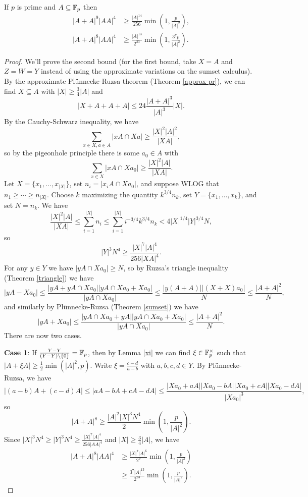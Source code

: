 \begin{thm} If $p$ is prime and $A \subseteq \mathbb{F}_p$ then
\begin{align*}
|A+A|^9|AA|^4 &\ge \frac{|A|^{14}}{256}\min\left(1,\frac{p}{|A|^2}\right),\\
|A+A|^8|AA|^4 &\ge \frac{|A|^{13}}{2^{23}}\min\left(1,\frac{3^7p}{|A|^2}\right).
\end{align*}
\end{thm}
\begin{proof} We'll prove the second bound (for the first bound, take $X=A$ and $Z=W=Y$ instead of using the approximate variations on the sumset calculus). By the approximate Pl\"unnecke-Ruzsa theorem (Theorem \ref{approx-pr}), we can find $X \subseteq A$ with $|X| \ge \frac{3}{4}|A|$ and
\[
|X+A+A+A| \le 24\frac{|A+A|^3}{|A|^3}|X|.
\]
By the Cauchy-Schwarz inequality, we have
\[
\sum_{x\in X,a\in A} |xA\cap Xa| \ge \frac{|X|^2|A|^2}{|XA|},
\]
so by the pigeonhole principle there is some $a_0\in A$ with
\[
\sum_{x\in X} |xA\cap Xa_0| \ge \frac{|X|^2|A|}{|XA|}.
\]
Let $X = \{x_1, ..., x_{|X|}\}$, set $n_i = |x_iA\cap Xa_0|$, and suppose WLOG that $n_1 \ge \cdots \ge n_{|X|}$. Choose $k$ maximizing the quantity $k^{3/4}n_k$, set $Y = \{x_1, ..., x_k\}$, and set $N = n_k$. We have
\[
\frac{|X|^2|A|}{|XA|} \le \sum_{i=1}^{|X|} n_i \le \sum_{i=1}^{|X|} i^{-3/4}k^{3/4}n_k < 4|X|^{1/4}|Y|^{3/4}N,
\]
so
\[
|Y|^3N^4 \ge \frac{|X|^7|A|^4}{256|XA|^4}.
\]
For any $y\in Y$ we have $|yA\cap Xa_0| \ge N$, so by Ruzsa's triangle inequality (Theorem \ref{triangle}) we have
\[
|yA-Xa_0| \le \frac{|yA+yA\cap Xa_0||yA\cap Xa_0+Xa_0|}{|yA\cap Xa_0|} \le \frac{|y(A+A)||(X+X)a_0|}{N} \le \frac{|A+A|^2}{N},
\]
and similarly by Pl\"unnecke-Ruzsa (Theorem \ref{sumset}) we have
\[
|yA+Xa_0| \le \frac{|yA\cap Xa_0+yA||yA\cap Xa_0+Xa_0|}{|yA\cap Xa_0|} \le \frac{|A+A|^2}{N}.
\]
There are now two cases.

\textbf{Case 1}: If $\frac{Y-Y}{(Y-Y)\setminus\{0\}} = \mathbb{F}_p$, then by Lemma \ref{xi} we can find $\xi \in \mathbb{F}_p^\times$ such that $|A+\xi A| \ge \frac{1}{2}\min(|A|^2,p)$. Write $\xi = \frac{c-d}{a-b}$ with $a,b,c,d \in Y$. By Pl\"unnecke-Ruzsa, we have
\[
|(a-b)A+(c-d)A| \le |aA-bA+cA-dA| \le \frac{|Xa_0+aA||Xa_0-bA||Xa_0+cA||Xa_0-dA|}{|Xa_0|^3},
\]
so
\[
|A+A|^8 \ge \frac{|A|^2|X|^3N^4}{2}\min\left(1,\frac{p}{|A|^2}\right).
\]
Since $|X|^3N^4 \ge |Y|^3N^4 \ge \frac{|X|^7|A|^4}{256|AA|^4}$ and $|X| \ge \frac{3}{4}|A|$, we have
\begin{align*}
|A+A|^8|AA|^4 &\ge \frac{|X|^7|A|^6}{2^9}\min\left(1,\frac{p}{|A|^2}\right)\\
&\ge \frac{3^7|A|^{13}}{2^{23}}\min\left(1,\frac{p}{|A|^2}\right).
\end{align*}


\end{proof}
